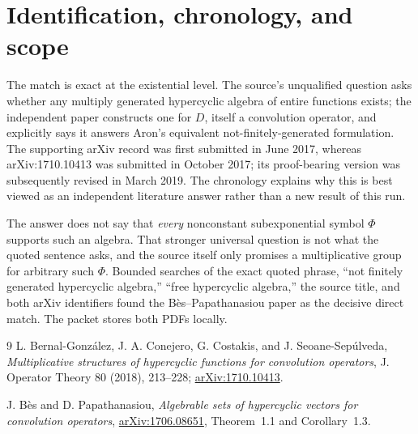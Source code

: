 \documentclass[11pt]{article}
\begin{document}
\section*{Identification, chronology, and scope}

The match is exact at the existential level.  The source's unqualified
question asks whether any multiply generated hypercyclic algebra of entire
functions exists; the independent paper constructs one for $D$, itself a
convolution operator, and explicitly says it answers Aron's equivalent
not-finitely-generated formulation.  The supporting arXiv record was first
submitted in June 2017, whereas arXiv:1710.10413 was submitted in October
2017; its proof-bearing version was subsequently revised in March 2019.  The
chronology explains why this is best viewed as an independent literature
answer rather than a new result of this run.

The answer does not say that \emph{every} nonconstant subexponential symbol
$\Phi$ supports such an algebra.  That stronger universal question is not what
the quoted sentence asks, and the source itself only promises a multiplicative
group for arbitrary such $\Phi$.  Bounded searches of the exact quoted phrase,
``not finitely generated hypercyclic algebra,'' ``free hypercyclic algebra,''
the source title, and both arXiv identifiers found the B\`es--Papathanasiou
paper as the decisive direct match.  The packet stores both PDFs locally.

\begin{thebibliography}{9}
L. Bernal-Gonz\'alez, J. A. Conejero, G. Costakis, and J. Seoane-Sep\'ulveda,
\emph{Multiplicative structures of hypercyclic functions for convolution
operators}, J. Operator Theory 80 (2018), 213--228;
\href{https://arxiv.org/abs/1710.10413}{arXiv:1710.10413}.

J. B\`es and D. Papathanasiou,
\emph{Algebrable sets of hypercyclic vectors for convolution operators},
\href{https://arxiv.org/abs/1706.08651}{arXiv:1706.08651},
Theorem~1.1 and Corollary~1.3.
\end{thebibliography}
\end{document}
